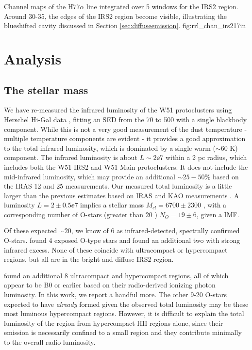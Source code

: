{Channel maps of the H77$\alpha$ line integrated over 5 \kms windows
for the IRS2 region.  Around 30-35\kms, the edges of the IRS2 region become
visible, illustrating the blueshifted cavity discussed in Section
\ref{sec:diffuseemission}.}
{fig:rrl_chan_irs2}{1}{7in}


\section{Analysis}
\subsection{The stellar mass}
\label{sec:stellarmass}

We have re-measured the infrared luminosity of the W51 protoclusters using Herschel
Hi-Gal data \citep{Molinari2010a,Traficante2011a}, fitting an SED from the 70
to 500 \um with a single blackbody component.  While this is not a very good
measurement of the dust temperature - multiple temperature components are
evident \citep{Sievers1991a} - it provides a good approximation to the total
infrared luminosity, which is dominated by a single warm ($\sim60$ K) component.  The
infrared luminosity is about $L\sim2\ee{7}$ \lsun within a 2 pc radius, which includes
both the W51 IRS2 and W51 Main protoclusters.  It does not include the
mid-infrared luminosity, which may provide an additional $\sim25-50\%$ based on
the IRAS 12 and 25 \um measurements.  Our measured total luminosity is a little
larger than the previous estimates based on IRAS and KAO measurements
\citep{Harvey1986a,Sievers1991a}.  A luminosity $L=2\pm0.5\ee{7}$ \lsun implies
a stellar mass $M_{cl} = 6700 \pm 2300$ \msun, with a corresponding number of
O-stars (greater than 20 \msun) $N_O = 19 \pm 6$, given a \citet{Kroupa2001a} IMF.

Of these expected $\sim20$, we know of 6 as infrared-detected, spectrally
confirmed O-stars.  \citet{Figueredo2008a} found 4 exposed O-type stars and
\citet{Barbosa2008a} found an additional two with strong infrared excess.  None
of these coincide with ultracompact or hypercompact \hii regions, but all are
in the bright and diffuse IRS2 region.

\citet{Mehringer1994a} found an additional 8 ultracompact and hypercompact \hii
regions, all of which appear to be B0 or earlier based on their radio-derived
ionizing photon luminosity.  In this work, we report a handful more.
The other 9-20 O-stars expected to have \emph{already} formed given the
observed total luminosity may be these most luminous hypercompact \hii regions.
However, it is difficult to explain the total luminosity of the region from
hypercompact HII regions alone, since their emission is necessarily confined to
a small region and they contribute minimally to the overall radio luminosity.

